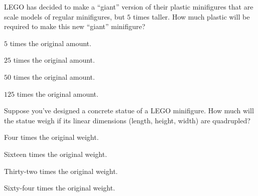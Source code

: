 \documentclass[12pt,noauthor,nooutcomes]{ximera}
\author{Bart Snapp}
\begin{document}
\maketitle








\begin{exercise}
  LEGO has decided to make a ``giant'' version of their plastic
  minifigures that are scale models of regular minifigures, but $5$
  times taller.  How much plastic will be required to make this new
  ``giant'' minifigure?
    \begin{enumerate}\begin{multicols}{2}
    \item $5$ times the original amount.
    \item $25$ times the original amount.
    \item $50$ times the original amount.
    \item $125$ times the original amount.
    \end{multicols}
  \end{enumerate}%
\end{exercise}







\begin{exercise}
  Suppose you've designed a concrete statue of a LEGO minifigure.  How
  much will the statue weigh if its linear dimensions (length,
  height, width) are quadrupled?
  \begin{enumerate}\begin{multicols}{2}
    \item Four times the original weight.
    \item Sixteen times the original weight.
    \item Thirty-two times the original weight.
    \item Sixty-four times the original weight.
    \end{multicols}
  \end{enumerate}
\end{exercise}
\end{document}
